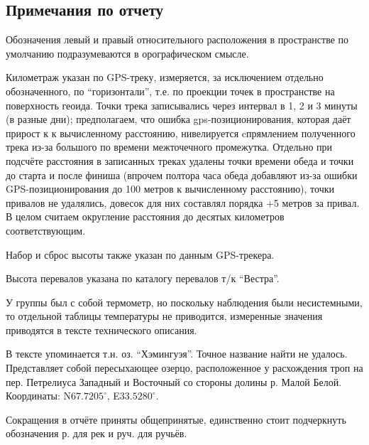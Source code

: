 \subsection{Примечания по отчету}
Обозначения левый и правый относительного расположения в пространстве по умолчанию подразумеваются в орографическом смысле.

Километраж указан по GPS-треку, измеряется, за исключением отдельно обозначенного, по \enquote{горизонтали},
т.е. по проекции точек в пространстве на поверхность геоида. Точки трека записывались через интервал в 1, 2 и 3 минуты
(в разные дни); предполагаем, что ошибка gps-позиционирования, которая даёт прирост к к вычисленному расстоянию,
нивелируется cпрямлением полученного трека из-за большого по времени межточечного промежутка.
Отдельно при подсчёте расстояния в записанных треках удалены точки времени обеда и точки до старта и после финиша
(впрочем полтора часа обеда добавляют из-за ошибки GPS-позиционирования до 100 метров к вычисленному расстоянию),
точки привалов не удалялись, довесок для них составлял порядка +5 метров за привал.
В целом считаем округление расстояния до десятых километров соответствующим.

Набор и сброс высоты также указан по данным GPS-трекера.

Высота перевалов указана по каталогу перевалов т/к \enquote{Вестра}.

У группы был с собой термометр, но поскольку наблюдения были несистемными, то отдельной таблицы температуры не приводится,
измеренные значения приводятся в тексте технического описания.

В тексте упоминается т.н. оз. \enquote{Хэмингуэя}. Точное название найти не удалось.
Представляет собой пересыхающее озерцо, расположенное у расхождения троп на пер. Петрелиуса Западный и Восточный со
стороны долины р. Малой Белой. Координаты: N$67.7205^{\circ}$, E$33.5280^{\circ}$.

Сокращения в отчёте приняты общепринятые, единственно стоит подчеркнуть обозначения р. для рек и руч. для ручьёв.
